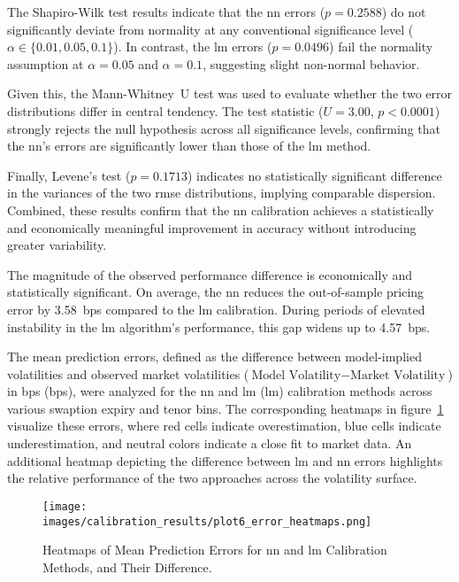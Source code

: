The Shapiro-Wilk test results indicate that the \ac{nn} errors (\(p=0.2588\)) do not significantly deviate from normality at any conventional significance level (\(\alpha \in \{0.01, 0.05, 0.1\}\)). In contrast, the \ac{lm} errors (\(p=0.0496\)) fail the normality assumption at \(\alpha=0.05\) and \(\alpha=0.1\), suggesting slight non-normal behavior.

Given this, the Mann-Whitney~U test was used to evaluate whether the two error distributions differ in central tendency. The test statistic (\(U=3.00\), \(p<0.0001\)) strongly rejects the null hypothesis across all significance levels, confirming that the \ac{nn}'s errors are significantly lower than those of the \ac{lm} method.

Finally, Levene's test (\(p=0.1713\)) indicates no statistically significant difference in the variances of the two \ac{rmse} distributions, implying comparable dispersion. Combined, these results confirm that the \ac{nn} calibration achieves a statistically and economically meaningful improvement in accuracy without introducing greater variability.

The magnitude of the observed performance difference is economically and statistically significant. On average, the \ac{nn} reduces the out-of-sample pricing error by 3.58~\ac{bps} compared to the \ac{lm} calibration. During periods of elevated instability in the \ac{lm} algorithm's performance, this gap widens up to 4.57~\ac{bps}.

The mean prediction errors, defined as the difference between model-implied volatilities and observed market volatilities (\(\text{Model Volatility} - \text{Market Volatility}\)) in \ac{bps} (\ac{bps}), were analyzed for the \ac{nn} and \ac{lm} (\ac{lm}) calibration methods across various swaption expiry and tenor bins. The corresponding heatmaps in figure~\ref{fig:error_heatmaps} visualize these errors, where red cells indicate overestimation, blue cells indicate underestimation, and neutral colors indicate a close fit to market data. An additional heatmap depicting the difference between \ac{lm} and \ac{nn} errors highlights the relative performance of the two approaches across the volatility surface.

\begin{figure}[H]
	\centering
	\texttt{[image: images/calibration\_results/plot6\_error\_heatmaps.png]}
	\caption{Heatmaps of Mean Prediction Errors for \ac{nn} and \ac{lm} Calibration Methods, and Their Difference.}
	\label{fig:error_heatmaps}
\end{figure}

